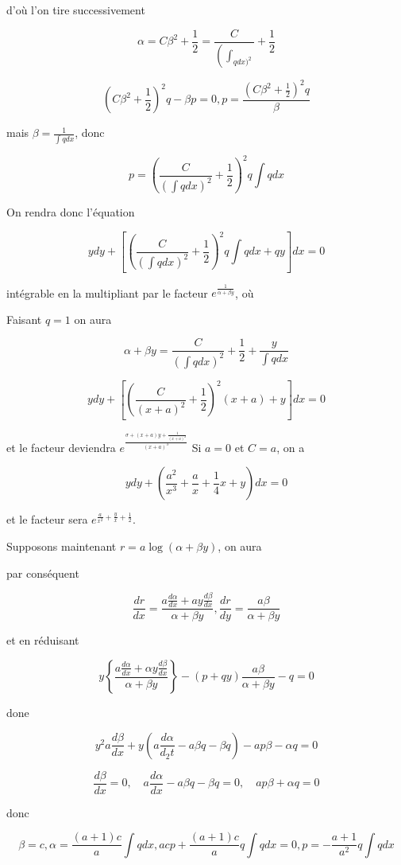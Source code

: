 \documentclass{article}
\begin{document}
d'où l'on tire successivement

\[
\alpha=C \beta^{2}+\frac{1}{2}=\frac{C}{\left(\int_{q d x)^{2}}\right.}+\frac{1}{2}
\]

\[
\left(C \beta^{2}+\frac{1}{2}\right)^{2} q-\beta p=0, p=\frac{\left(C \beta^{2}+\frac{1}{2}\right)^{2} q}{\beta}
\]

mais \(\beta=\frac{1}{\int q d x}\), donc

\[
p=\left(\frac{C}{\left(\int q d x\right)^{2}}+\frac{1}{2}\right)^{2} q \int q d x
\]

On rendra donc l'équation

\[
y d y+\left[\left(\frac{C}{\left(\int q d x\right)^{2}}+\frac{1}{2}\right)^{2} q \int q d x+q y\right] d x=0
\]

intégrable en la multipliant par le facteur \(e^{\frac{1}{\alpha+\beta y}}\), où

Faisant \(q=1\) on aura

\[
\alpha+\beta y=\frac{C}{\left(\int q d x\right)^{2}}+\frac{1}{2}+\frac{y}{\int q d x}
\]

\[
y d y+\left[\left(\frac{C}{(x+a)^{2}}+\frac{1}{2}\right)^{2}(x+a)+y\right] d x=0
\]

et le facteur deviendra \(e^{\frac{\sigma+(x+a) y+\frac{1}{(x+a)^{2}}}{(x+a)^{3}}}\) Si \(a=0\) et \(C=a\), on a

\[
y d y+\left(\frac{a^{2}}{x^{3}}+\frac{a}{x}+\frac{1}{4} x+y\right) d x=0
\]

et le facteur sera \(e^{\frac{a}{x^{2}}+\frac{y}{x}+\frac{1}{2}}\).

Supposons maintenant \(r=a \log (\alpha+\beta y)\), on aura

par conséquent

\[
\frac{d r}{d x}=\frac{a \frac{d \alpha}{d x}+a y \frac{d \beta}{d x}}{\alpha+\beta y}, \frac{d r}{d y}=\frac{a \beta}{\alpha+\beta y}
\]

et en réduisant

\[
y\left\{\frac{a \frac{d \alpha}{d x}+\alpha y \frac{d \beta}{d x}}{\alpha+\beta y}\right\}-(p+q y) \frac{a \beta}{\alpha+\beta y}-q=0
\]

done

\[
y^{2} a \frac{d \beta}{d x}+y\left(a \frac{d \alpha}{d_{2} t}-a \beta q-\beta q\right)-a p \beta-\alpha q=0
\]

\[
\frac{d \beta}{d x}=0, \quad a \frac{d \alpha}{d x}-a \beta q-\beta q=0, \quad a p \beta+\alpha q=0
\]

donc

\[
\beta=c, \alpha=\frac{(a+1) c}{a} \int q d x, a c p+\frac{(a+1) c}{a} q \int q d x=0, p=-\frac{a+1}{a^{2}} q \int q d x
\]
\end{document}
